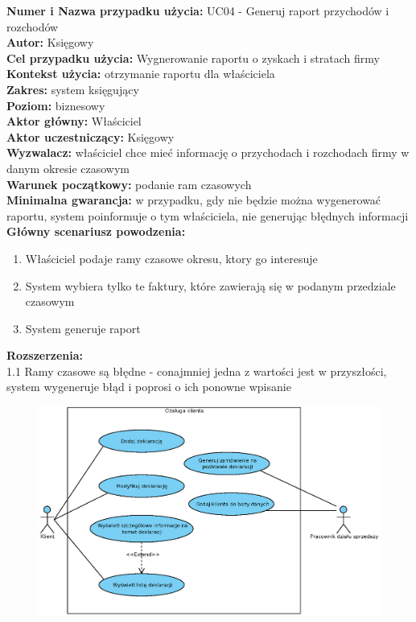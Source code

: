 \textbf{Numer i Nazwa przypadku użycia:} UC04 - Generuj raport przychodów i rozchodów \\
\textbf{Autor:} Księgowy\\
\textbf{Cel przypadku użycia:} Wygnerowanie raportu o zyskach i stratach firmy \\
\textbf{Kontekst użycia:} otrzymanie raportu dla właściciela  \\
\textbf{Zakres:} system księgujący \\
\textbf{Poziom:} biznesowy \\
\textbf{Aktor główny:} Właściciel \\
\textbf{Aktor uczestniczący:} Księgowy \\
\textbf{Wyzwalacz:} właściciel chce mieć informację o przychodach i rozchodach firmy w danym okresie czasowym \\
\textbf{Warunek początkowy:} podanie ram czasowych  \\
\textbf{Minimalna gwarancja:} w przypadku, gdy nie będzie można wygenerować raportu, system poinformuje o tym właściciela, nie generując błędnych informacji \\
\textbf{Główny scenariusz powodzenia:} 
	\begin{enumerate}
		\item Właściciel podaje ramy czasowe okresu, ktory go interesuje
		\item System wybiera tylko te faktury, które zawierają się w podanym przedziale czasowym
		\item System generuje raport
	\end{enumerate}
\textbf{Rozszerzenia:} \\
1.1 Ramy czasowe są błędne - conajmniej jedna z wartości jest w przyszłości, system wygeneruje błąd i poprosi o ich ponowne wpisanie


\begin{figure}[H]
	\centering
	\includegraphics[width=1.1\textwidth]{img/UC/deklaracje.eps}
\end{figure}

